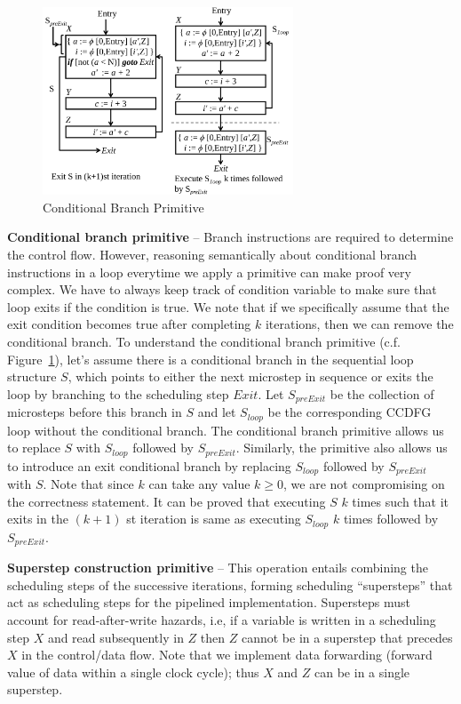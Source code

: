\begin{figure}[t!]
\begin{center}
\includegraphics[height=2.2in]{fig-proposal/conditional-branch-primitive}
\end{center}
\caption{Conditional Branch Primitive}
\label{fig:primitives2}
\end{figure}

{\textbf {Conditional branch primitive}} -- Branch instructions are required to determine the control flow. However,
reasoning semantically about conditional branch instructions in a loop everytime we apply a primitive can make proof very complex. We have to always keep track of condition variable to make sure that loop exits if the condition is true.
We note that if we specifically assume that the exit condition becomes true after completing $k$ iterations, then we can remove the conditional branch.
To understand the conditional branch primitive (c.f. Figure~\ref{fig:primitives2}), 
let's assume there is a conditional branch in the sequential loop structure $S$, which points to either
the next microstep in sequence or exits the loop by branching to the scheduling step
$Exit$. Let $S_{preExit}$ be the collection of microsteps before this branch in $S$ and
let $S_{loop}$ be the corresponding CCDFG loop without the conditional branch.
The conditional branch primitive allows us to replace $S$ with $S_{loop}$ followed by
$S_{preExit}$. Similarly,
the primitive also allows us to introduce an exit conditional branch by replacing
$S_{loop}$ followed by $S_{preExit}$ with $S$.
Note that since $k$ can take any value $k \ge 0$, we are not compromising on the correctness statement.  
It can be proved that executing $S$ $k$ times such that it exits in the $(k+1)$ st
iteration is same as executing $S_{loop}$ $k$ times followed by $S_{preExit}$.

{\textbf {Superstep construction primitive}} -- This operation entails combining the scheduling steps of the successive
iterations, forming scheduling ``supersteps'' that act as scheduling steps for the pipelined implementation. Supersteps must
account for read-after-write hazards, i.e, if a variable is written in a scheduling step $X$ and read subsequently in
$Z$ then $Z$ cannot be in a superstep that precedes $X$ in the control/data flow.  Note that we implement data
forwarding (forward value of data within a single clock cycle); thus $X$ and $Z$ can be in a single superstep.

